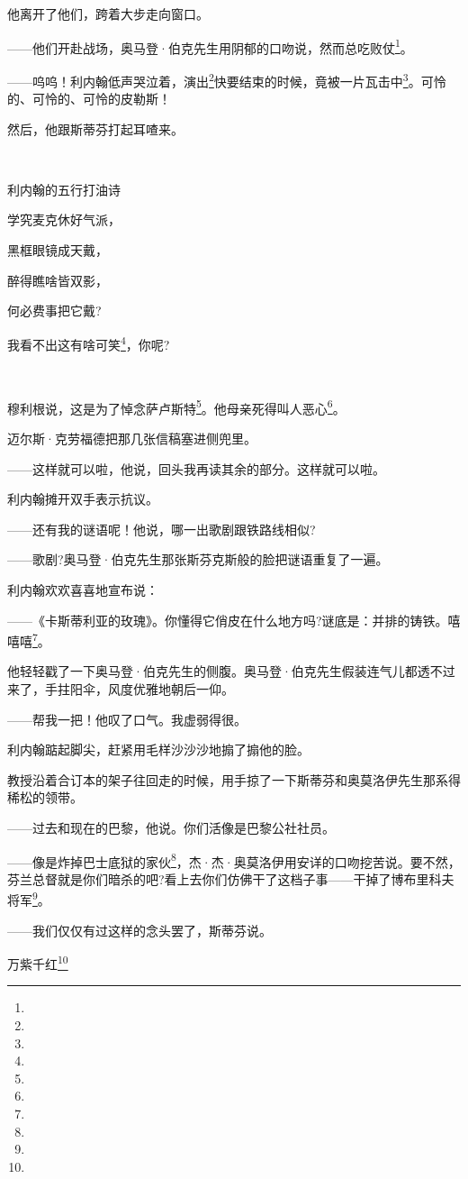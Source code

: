 \par 他离开了他们，跨着大步走向窗口。
\par ——他们开赴战场，奥马登·伯克先生用阴郁的口吻说，然而总吃败仗\footnote{}。
\par ——呜呜！利内翰低声哭泣着，演出\footnote{}快要结束的时候，竟被一片瓦击中\footnote{}。可怜的、可怜的、可怜的皮勒斯！
\par 然后，他跟斯蒂芬打起耳喳来。
\par  
\par 利内翰的五行打油诗
\par 学究麦克休好气派，
\par 黑框眼镜成天戴，
\par 醉得瞧啥皆双影，
\par 何必费事把它戴?
\par 我看不出这有啥可笑\footnote{}，你呢?
\par  
\par 穆利根说，这是为了悼念萨卢斯特\footnote{}。他母亲死得叫人恶心\footnote{}。
\par 迈尔斯·克劳福德把那几张信稿塞进侧兜里。
\par ——这样就可以啦，他说，回头我再读其余的部分。这样就可以啦。
\par 利内翰摊开双手表示抗议。
\par ——还有我的谜语呢！他说，哪一出歌剧跟铁路线相似?
\par ——歌剧?奥马登·伯克先生那张斯芬克斯般的脸把谜语重复了一遍。
\par 利内翰欢欢喜喜地宣布说：
\par ——《卡斯蒂利亚的玫瑰》。你懂得它俏皮在什么地方吗?谜底是：并排的铸铁。嘻嘻嘻\footnote{}。
\par 他轻轻戳了一下奥马登·伯克先生的侧腹。奥马登·伯克先生假装连气儿都透不过来了，手拄阳伞，风度优雅地朝后一仰。
\par ——帮我一把！他叹了口气。我虚弱得很。
\par 利内翰踮起脚尖，赶紧用毛样沙沙沙地搧了搧他的脸。
\par 教授沿着合订本的架子往回走的时候，用手掠了一下斯蒂芬和奥莫洛伊先生那系得稀松的领带。
\par ——过去和现在的巴黎，他说。你们活像是巴黎公社社员。
\par ——像是炸掉巴士底狱的家伙\footnote{}，杰·杰·奥莫洛伊用安详的口吻挖苦说。要不然，芬兰总督就是你们暗杀的吧?看上去你们仿佛干了这档子事——干掉了博布里科夫将军\footnote{}。
\par ——我们仅仅有过这样的念头罢了，斯蒂芬说。
\par 万紫千红\footnote{}

